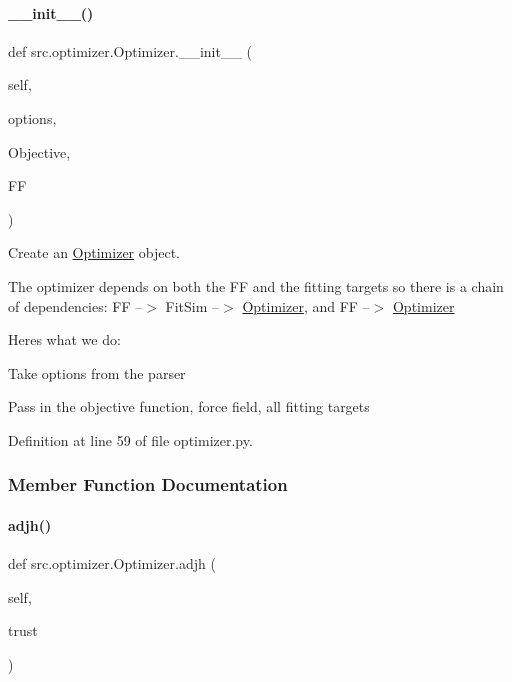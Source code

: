 \paragraph{\texorpdfstring{\+\_\+\+\_\+init\+\_\+\+\_\+()}{\_\_init\_\_()}}
{\footnotesize\ttfamily def src.\+optimizer.\+Optimizer.\+\_\+\+\_\+init\+\_\+\+\_\+ (\begin{DoxyParamCaption}\item[{}]{self,  }\item[{}]{options,  }\item[{}]{Objective,  }\item[{}]{FF }\end{DoxyParamCaption})}



Create an \hyperlink{classsrc_1_1optimizer_1_1Optimizer}{Optimizer} object. 

The optimizer depends on both the FF and the fitting targets so there is a chain of dependencies\+: FF --$>$ Fit\+Sim --$>$ \hyperlink{classsrc_1_1optimizer_1_1Optimizer}{Optimizer}, and FF --$>$ \hyperlink{classsrc_1_1optimizer_1_1Optimizer}{Optimizer}

Here\textquotesingle{}s what we do\+:
\begin{DoxyItemize}
\item Take options from the parser
\item Pass in the objective function, force field, all fitting targets 
\end{DoxyItemize}

Definition at line 59 of file optimizer.\+py.



\subsubsection{Member Function Documentation}
\mbox{\label{classsrc_1_1optimizer_1_1Optimizer_a7ec731011adb2f1b994dfa112e364e7d}} 
\paragraph{\texorpdfstring{adjh()}{adjh()}}
{\footnotesize\ttfamily def src.\+optimizer.\+Optimizer.\+adjh (\begin{DoxyParamCaption}\item[{}]{self,  }\item[{}]{trust }\end{DoxyParamCaption})}



